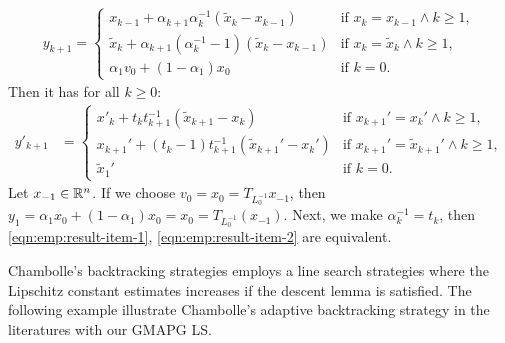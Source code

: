 \documentclass[12pt]{report}
\begin{document}
\begin{example}
            \begin{align}\label{eqn:emp:result-item-1}
                y_{k + 1} = \begin{cases}
                    x_{k - 1} + \alpha_{k + 1}\alpha_k^{-1}(\tilde x_k - x_{k - 1})
                    & \text{if } x_k = x_{k - 1} \wedge k \ge 1,
                    \\
                    \tilde x_k + \alpha_{k + 1}(\alpha_k^{-1} - 1)(\tilde x_k - x_{k - 1})
                    & \text{if } x_k = \tilde x_k \wedge k \ge 1,
                    \\
                    \alpha_1v_0 + (1 - \alpha_1)x_0 & \text{if } k = 0. 
                \end{cases}
            \end{align}
            Then it has for all $k \ge 0$: 
            \begin{align}\label{eqn:emp:result-item-2}
                y'_{k + 1} &= 
                \begin{cases}
                    x'_k + t_kt_{k + 1}^{-1}(\tilde x_{k + 1} - x_k) 
                    & \text{if } x_{k + 1}' = x_k' \wedge k \ge 1,
                    \\
                    x_{k + 1}' + (t_k - 1)t_{k + 1}^{-1}(\tilde x_{k + 1}' - x_k')  
                    & \text{if } x_{k + 1}' = \tilde x_{k + 1}'\wedge k \ge 1, 
                    \\
                    \tilde x_1'
                    & 
                    \text{if } k = 0. 
                \end{cases}
            \end{align}
            Let $x_{-1} \in \mathbb R^n$. 
            If we choose $v_0 = x_0 = T_{L_0^{-1}} x_{-1}$, then $y_1 = \alpha_1 x_0 + (1 - \alpha_1)x_0 = x_0 = T_{L_0^{-1}}(x_{-1})$.
            Next, we make $\alpha_k^{-1} = t_k$, then \eqref{eqn:emp:result-item-1}, \eqref{eqn:emp:result-item-2} are equivalent. 
        \end{example}
        Chambolle's backtracking strategies employs a line search strategies where the Lipschitz constant estimates increases if the descent lemma is satisfied. 
        The following example illustrate Chambolle's adaptive backtracking strategy in the literatures with our GMAPG LS. 
\end{document}
